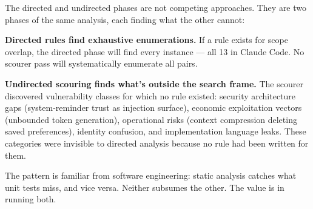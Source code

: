 The directed and undirected phases are not competing approaches. They
are two phases of the same analysis, each finding what the other cannot:

\textbf{Directed rules find exhaustive enumerations.} If a rule exists
for scope overlap, the directed phase will find every instance --- all
13 in Claude Code. No scourer pass will systematically enumerate all
pairs.

\textbf{Undirected scouring finds what's outside the search frame.} The
scourer discovered vulnerability classes for which no rule existed:
security architecture gaps (system-reminder trust as injection surface),
economic exploitation vectors (unbounded token generation), operational
risks (context compression deleting saved preferences), identity
confusion, and implementation language leaks. These categories were
invisible to directed analysis because no rule had been written for
them.

The pattern is familiar from software engineering: static analysis
catches what unit tests miss, and vice versa. Neither subsumes the
other. The value is in running both.
